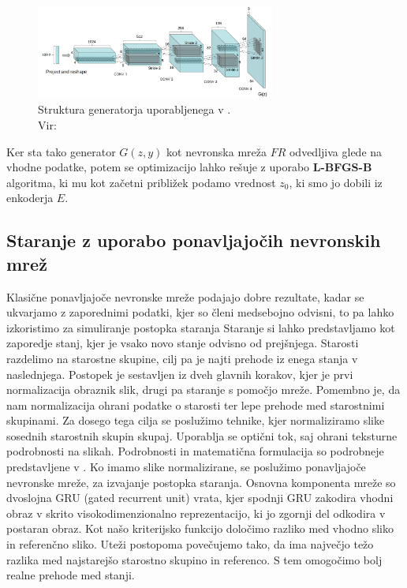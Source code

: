 \documentclass[12pt,a4paper,twoside]{article}
\theoremstyle{definition} %
\theoremstyle{plain} %
\numberwithin{equation}{section}  %
\begin{document}
\begin{figure}[ht]
  \centering
  \includegraphics[width=0.7\textwidth]{images/cgan_architecture}
 \caption[Struktura generatorja uporabljenega v \cite{antipov2017face}]{Struktura generatorja uporabljenega v \cite{antipov2017face}.\\Vir: \cite{radford2015unsupervised}}
  \label{fig:agecgan-generator}
\end{figure}

Ker sta tako generator $G(z,y)$ kot nevronska mreža $FR$ odvedljiva glede na vhodne podatke, potem se optimizacijo lahko rešuje z uporabo \textbf{L-BFGS-B} algoritma, ki mu kot začetni približek podamo vrednost $z_0$, ki smo jo dobili iz enkoderja $E$. 
\subsection{Staranje z uporabo ponavljajočih nevronskih mrež}
Klasične ponavljajoče nevronske mreže podajajo dobre rezultate, kadar se ukvarjamo z zaporednimi podatki, kjer so členi medsebojno odvisni, to pa lahko izkoristimo za simuliranje postopka staranja \cite{wang2016recurrent}
Staranje si lahko predstavljamo kot zaporedje stanj, kjer je vsako novo stanje odvisno od prejšnjega. Starosti razdelimo na starostne skupine, cilj pa je najti prehode iz enega stanja v naslednjega. 
Postopek je sestavljen iz dveh glavnih korakov, kjer je prvi normalizacija obraznik slik, drugi pa staranje s pomočjo mreže. 
Pomembno je, da nam normalizacija ohrani podatke o starosti ter lepe prehode med starostnimi skupinami. 
Za dosego tega cilja se poslužimo tehnike, kjer normaliziramo slike sosednih starostnih skupin skupaj. Uporablja se  optični tok, saj  ohrani teksturne podrobnosti na slikah.  Podrobnosti in matematična formulacija  so podrobneje predstavljene  v 
\cite{wang2016recurrent}. 
Ko imamo slike normalizirane, se poslužimo ponavljajoče nevronske mreže, za izvajanje postopka staranja. 
Osnovna komponenta mreže so dvoslojna GRU (gated recurrent unit) vrata, kjer spodnji GRU zakodira vhodni obraz v skrito visokodimenzionalno reprezentacijo, ki jo zgornji del odkodira v postaran obraz. Kot našo kriterijsko funkcijo 
določimo razliko med vhodno sliko in referenčno sliko. Uteži postopoma povečujemo tako, da ima največjo težo razlika med najstarejšo starostno skupino in referenco. S tem omogočimo bolj realne prehode med stanji.
\end{document}

